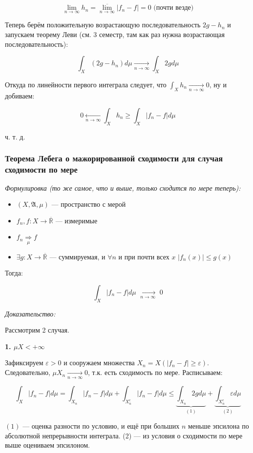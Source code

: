 \documentclass{article}
\def\dbl{\,\,}
\def\rinf{\overline{\mathbb{R}}}
\def\goesto#1{\underset{#1}{\longrightarrow}}
\def\toinf#1{\goesto{#1 \rightarrow \infty}}
\def\ntoinf{\toinf{n}}
\begin{document}
\[\lim_{n \rightarrow \infty} h_n = \overline{\lim_{n \rightarrow \infty}} |f_n - f| = 0 \text{ (почти везде)}\]

Теперь берём положительную возрастающую последовательность $2g - h_n$ и запускаем теорему Леви (см. 3 семестр, там как раз нужна возрастающая последовательность):

\[\int_{X} (2g - h_n) d\mu \ntoinf \int_{X} 2g d\mu\]

Откуда по линейности первого интеграла следует, что $\int_{X} h_n \ntoinf 0$, ну и добиваем:

\[0 \underset{n \rightarrow \infty}{\longleftarrow} \int_{X} h_n \ge \int_{X} |f_n - f| d \mu\]

ч. т. д. 

\subsubsection{Теорема Лебега о мажорированной сходимости для случая сходимости по мере}
\textit{Формулировка (то же самое, что и выше, только сходится по мере теперь):}

\begin{itemize}
    \item $(X, \mathfrak{A}, \mu)$ --- пространство с мерой
    \item $f_n, f: X \rightarrow \rinf$ --- измеримые
    \item $f_n \underset{\mu}{\Longrightarrow} f$
    \item $\exists g: X \rightarrow \rinf$ --- суммируемая, и $\forall n$ и при почти всех $x \dbl |f_n(x)| \le g(x)$
\end{itemize}

Тогда:

\[\int_{X}|f_n - f| d \mu \dbl \ntoinf \dbl 0\]

\textit{Доказательство:}

Рассмотрим 2 случая.

\textbf{1. $\mu X < + \infty$}

Зафиксируем $\varepsilon > 0$ и сооружаем множества $X_n = X(|f_n - f| \ge \varepsilon)$. Следовательно, $\mu X_n \ntoinf 0$, т.к. есть сходимость по мере. Расписываем:

\[\int_{X} |f_n - f| d\mu = \int_{X_n} |f_n - f| d\mu + \int_{X^c_n} |f_n - f| d\mu \le \underbrace{\int_{X_n} 2g d\mu}_{(1)} + \underbrace{\int_{X^c_n} \varepsilon d\mu}_{(2)}\]

$(1)$ --- оценка разности по условию, и ещё при больших $n$ меньше эпсилона по абсолютной непрерывности интеграла. (2) --- из условия о сходимости по мере выше оцениваем эпсилоном.
\end{document}
